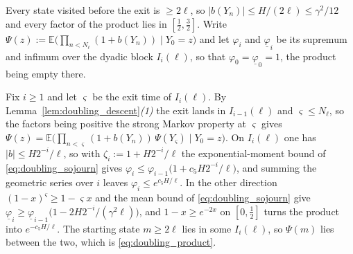 Every state visited before the exit is $\geq2\ell$, so $|b(Y_n)|\leq H/(2\ell)\leq\gamma^2/12$
and every factor of the product lies in $[\tfrac12,\tfrac32]$. Write
$\Psi(z):=\mathbb E\bigl(\prod_{n<N_\ell}(1+b(Y_n))\mid Y_0=z\bigr)$ and let $\varphi_i$ and
$\underline\varphi_i$ be its supremum and infimum over the dyadic block $I_i(\ell)$, so that
$\varphi_0=\underline\varphi_0=1$, the product being empty there.

Fix $i\geq1$ and let $\varsigma$ be the exit time of $I_i(\ell)$. By
Lemma~\ref{lem:doubling_descent}\emph{(1)} the exit lands in $I_{i-1}(\ell)$ and
$\varsigma\leq N_\ell$, so the factors being positive the strong Markov property at $\varsigma$
gives $\Psi(z)=\mathbb E\bigl(\prod_{n<\varsigma}(1+b(Y_n))\,\Psi(Y_\varsigma)\mid Y_0=z\bigr)$.
On $I_i(\ell)$ one has $|b|\leq H2^{-i}/\ell$, so with $\zeta_i:=1+H2^{-i}/\ell$ the
exponential-moment bound of \eqref{eq:doubling_sojourn} gives
$\varphi_i\leq\varphi_{i-1}\bigl(1+c_5H2^{-i}/\ell\bigr)$, and summing the geometric series
over $i$ leaves $\varphi_i\leq e^{c_5H/\ell}$. In the other direction
$(1-x)^{\varsigma}\geq1-\varsigma x$ and the mean bound of \eqref{eq:doubling_sojourn} give
$\underline\varphi_i\geq\underline\varphi_{i-1}\bigl(1-2H2^{-i}/(\gamma^2\ell)\bigr)$, and
$1-x\geq e^{-2x}$ on $[0,\tfrac12]$ turns the product into $e^{-c_5H/\ell}$. The starting
state $m\geq2\ell$ lies in some $I_i(\ell)$, so $\Psi(m)$ lies between the two, which is
\eqref{eq:doubling_product}.
